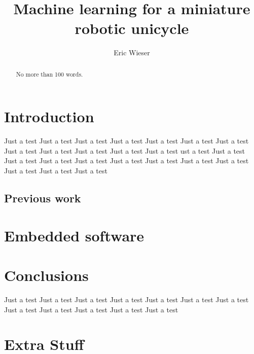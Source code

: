 \documentclass[12pt,a4paper]{IIBproject}
\begin{document}


\author{Eric Wieser}
\title{Machine learning for a miniature robotic unicycle}
\maketitle
\thispagestyle{empty}



\begin{abstract}
No more than 100 words.
\end{abstract}
\pagestyle{plain}
\tableofcontents
\newpage

\section{Introduction}
Just a test Just a test Just a test Just a test Just a test Just a test 
Just a test Just a test Just a test Just a test Just a test Just a test 
ust a test Just a test Just a test Just a test Just a test Just a test 
Just a test Just a test Just a test Just a test Just a test Just a test \cite{bbc-samsung-explosion}

\subsection{Previous work}

\section{Embedded software}



\section{Conclusions}
Just a test Just a test Just a test Just a test Just a test Just a test 
Just a test Just a test Just a test Just a test Just a test Just a test 

\printbibliography

\appendix

\section{Extra Stuff}
\end{document}
